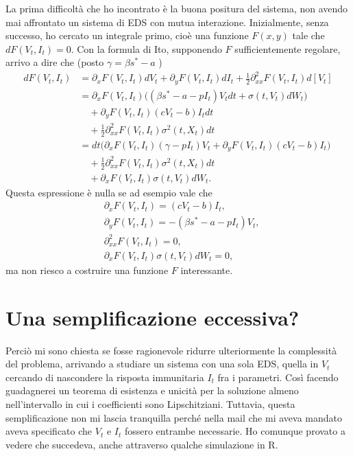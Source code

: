 \documentclass[12pt,a4paper,oneside]{amsart}
\theoremstyle{definition}
\begin{document}
La prima difficoltà che ho incontrato è la buona positura del sistema, non avendo mai affrontato un sistema di EDS con mutua interazione. Inizialmente, senza successo, ho cercato un integrale primo, cioè una funzione $F(x,y)$ tale che $dF(V_t,I_t)=0$. Con la formula di Ito, supponendo $F$ sufficientemente regolare, arrivo a dire che (posto $\gamma=\beta s^* -a $ ) 
\begin{align*}
dF(V_t,I_t) &= \partial_x F(V_t,I_t) dV_t + \partial_y F(V_t,I_t) dI_t +\frac{1}{2} \partial^2_{xx}F(V_t,I_t) d[V_t] \\
&=\partial_x F(V_t,I_t) \bigg(\left(\beta s^* -a -pI_t\right)V_tdt + \sigma(t,V_t)dW_t\bigg) \\
& \quad + \partial_y F(V_t,I_t) \left(cV_t-b\right)I_tdt \\
& \quad +\frac{1}{2} \partial^2_{xx}F(V_t,I_t) \sigma^2(t,X_t) dt \\
&= dt \bigg( \partial_x F(V_t,I_t) \left(\gamma-pI_t\right)V_t +  \partial_y F(V_t,I_t) \left(cV_t-b\right)I_t\bigg) \\
& \quad +\frac{1}{2} \partial^2_{xx}F(V_t,I_t) \sigma^2(t,X_t) dt\\
& \quad + \partial_x F(V_t,I_t)\sigma(t,V_t)dW_t .
\end{align*}
Questa espressione è nulla se ad esempio vale che
\begin{align*}
&\partial_x F(V_t,I_t)  = \left(cV_t-b\right)I_t, \\
&\partial_y F(V_t,I_t)  = -\left(\beta s^* -a -pI_t\right)V_t,\\
&\partial^2_{xx}F(V_t,I_t) = 0, \\
&\partial_x F(V_t,I_t)\sigma(t,V_t)dW_t = 0,
\end{align*}
ma non riesco a costruire una funzione $F$ interessante.

\section{Una semplificazione eccessiva?}

Perciò mi sono chiesta se fosse ragionevole ridurre ulteriormente la complessità del problema, arrivando a studiare un sistema con una sola EDS, quella in $V_t$ cercando di nascondere la risposta immunitaria $I_t$ fra i parametri. Così facendo guadagnerei un teorema di esistenza e unicità per la soluzione almeno nell'intervallo in cui i coefficienti sono Lipschitziani. Tuttavia, questa semplificazione non mi lascia tranquilla perché nella mail che mi aveva mandato aveva specificato che $V_t$ e $I_t$ fossero entrambe necessarie. Ho comunque provato a vedere che succedeva, anche attraverso qualche simulazione in R.
\end{document}
